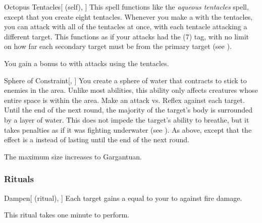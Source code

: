 \lowercase{\hypertarget{spell:Octopus Tentacles}{}}\label{spell:Octopus Tentacles}
\begin{attuneability}[Rank 5]{\hypertarget{spell:Octopus Tentacles}{Octopus Tentacles}}[ (self), ]
This spell functions like the \textit{aqueous tentacles} spell, except that you create eight tentacles.
Whenever you make a  with the tentacles, you can attack with all of the tentacles at once, with each tentacle attacking a different target.
This functions as if your attacks had the  (7) tag, with no limit on how far each secondary target must be from the primary target (see ).

\rankline
{} You gain a  bonus to  with attacks using the tentacles.
\end{attuneability}
\vspace{0.25em}



\lowercase{\hypertarget{spell:Sphere of Constraint}{}}\label{spell:Sphere of Constraint}
\begin{freeability}[Rank 5]{\hypertarget{spell:Sphere of Constraint}{Sphere of Constraint}}[, ]
You create a sphere of water that contracts to stick to enemies in the area.
Unlike most abilities, this ability only affects creatures whose entire space is within the area.
Make an attack vs. Reflex against each target.
\hit Until the end of the next round, the majority of the target's body is surrounded by a layer of water.
This does not impede the target's ability to breathe, but it takes penalties as if it was fighting underwater (see ).
\crit As above, except that the effect is a  instead of lasting until the end of the next round.

\rankline
{} The maximum size increases to Gargantuan.
\end{freeability}
\vspace{0.25em}



\subsubsection{Rituals}


\lowercase{\hypertarget{spell:Dampen}{}}\label{spell:Dampen}
\begin{attuneability}[Rank 1]{\hypertarget{spell:Dampen}{Dampen}}[ (ritual), ]
Each target gains a  equal to your  to  against fire damage.

This ritual takes one minute to perform.
\end{attuneability}
\vspace{0.25em}



